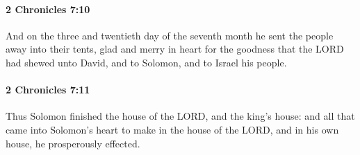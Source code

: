 		\paragraph{2 Chronicles 7:10} %
			\label{2CHRONICLES-7-10}

			And on the three and twentieth day of the seventh month he sent the people away into their tents, glad and merry in heart for the goodness that the LORD had shewed unto David, and to Solomon, and to Israel his people.


		\paragraph{2 Chronicles 7:11} %
			\label{2CHRONICLES-7-11}

			Thus Solomon finished the house of the LORD, and the king's house: and all that came into Solomon's heart to make in the house of the LORD, and in his own house, he prosperously effected.

